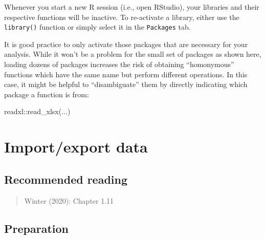 \documentclass[
  11pt,
  letterpaper,
  DIV=11,
  numbers=noendperiod]{scrreprt}
\newenvironment{Shaded}{\begin{snugshade}}{\end{snugshade}}
\newcommand{\FunctionTok}[1]{\textcolor[rgb]{0.28,0.35,0.67}{#1}}
\newcommand{\NormalTok}[1]{\textcolor[rgb]{0.00,0.23,0.31}{#1}}
\newcommand{\SpecialCharTok}[1]{\textcolor[rgb]{0.37,0.37,0.37}{#1}}
\begin{document}
\begin{tcolorbox}[enhanced jigsaw, toprule=.15mm, opacitybacktitle=0.6, coltitle=black, arc=.35mm, colback=white, title=\textcolor{quarto-callout-note-color}{\faInfo}\hspace{0.5em}{Activating libraries}, titlerule=0mm, toptitle=1mm, bottomtitle=1mm, breakable, rightrule=.15mm, opacityback=0, bottomrule=.15mm, leftrule=.75mm, colframe=quarto-callout-note-color-frame, left=2mm, colbacktitle=quarto-callout-note-color!10!white]

Whenever you start a new R session (i.e., open RStudio), your libraries
and their respective functions will be inactive. To re-activate a
library, either use the \texttt{library()} function or simply select it
in the \texttt{Packages} tab.

\end{tcolorbox}

It is good practice to only activate those packages that are necessary
for your analysis. While it won't be a problem for the small set of
packages as shown here, loading dozens of packages increases the risk of
obtaining ``homonymous'' functions which have the same name but perform
different operations. In this case, it might be helpful to
``disambiguate'' them by directly indicating which package a function is
from:

\begin{Shaded}
\begin{Highlighting}[]
\NormalTok{readxl}\SpecialCharTok{::}\FunctionTok{read\_xlsx}\NormalTok{(...)}
\end{Highlighting}
\end{Shaded}

\chapter{Import/export data}\label{importexport-data}

\section{Recommended reading}\label{recommended-reading-3}

\begin{quote}
Winter (2020): Chapter 1.11
\end{quote}

\section{Preparation}\label{preparation}
\end{document}

